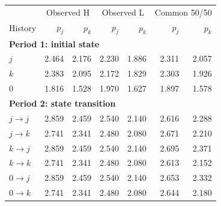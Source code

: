 \begin{tabular}{lrrrrrr}\toprule
& \multicolumn{2}{c}{Observed H} & \multicolumn{2}{c}{Observed L} & \multicolumn{2}{c}{Common 50/50}\\
History & $p_j$ & $p_k$ & $p_j$ & $p_k$ & $p_j$ & $p_k$\\\midrule
\multicolumn{7}{l}{\textbf{Period 1: initial state}}\\[2pt]
$j$ & 2.464 & 2.176 & 2.230 & 1.886 & 2.311 & 2.057\\
$k$ & 2.383 & 2.095 & 2.172 & 1.829 & 2.303 & 1.926\\
$0$ & 1.816 & 1.528 & 1.970 & 1.627 & 1.897 & 1.578\\
\midrule
\multicolumn{7}{l}{\textbf{Period 2: state transition}}\\[2pt]
$j\to j$ & 2.859 & 2.459 & 2.540 & 2.140 & 2.616 & 2.288\\
$j\to k$ & 2.741 & 2.341 & 2.480 & 2.080 & 2.671 & 2.210\\
$k\to j$ & 2.859 & 2.459 & 2.540 & 2.140 & 2.695 & 2.371\\
$k\to k$ & 2.741 & 2.341 & 2.480 & 2.080 & 2.613 & 2.152\\
$0\to j$ & 2.859 & 2.459 & 2.540 & 2.140 & 2.653 & 2.332\\
$0\to k$ & 2.741 & 2.341 & 2.480 & 2.080 & 2.644 & 2.180\\
\bottomrule\end{tabular}

